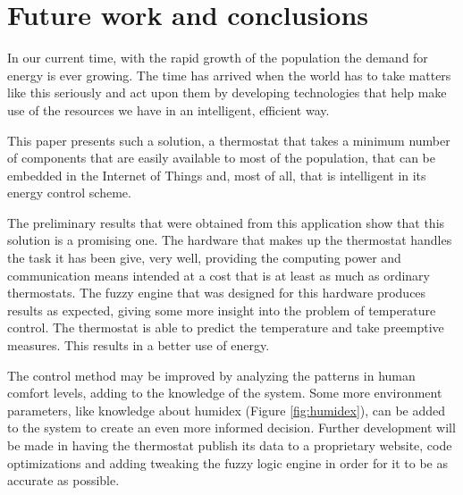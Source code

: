 
\chapter{Future work and conclusions}
\label{chap:concth}

\qquad In our current time, with the rapid growth of the population the demand for energy is ever growing.
The time has arrived when the world has to take matters like this seriously and act upon them by developing
technologies that help make use of the resources we have in an intelligent, efficient way.

\qquad This paper presents such a solution, a thermostat that takes a minimum number of components that are
easily available to most of the population, that can be embedded in the Internet of Things and, most of all,
that is intelligent in its energy control scheme.

\qquad The preliminary results that were obtained from this application show that this solution is a promising
one. The hardware that makes up the thermostat handles the task it has been give, very well, providing the
computing power and communication means intended at a cost that is at least as much as ordinary thermostats.
The fuzzy engine that was designed for this hardware produces results as expected, giving some more insight
into the problem of temperature control. The thermostat is able to predict the temperature and take preemptive
measures. This results in a better use of energy.

\qquad The control method may be improved by analyzing the patterns in  human comfort levels, adding to the
knowledge of the system. Some more environment parameters, like knowledge about humidex (Figure
\ref{fig:humidex}), can be added to the system to create an even more informed decision. Further development
will be made in having the thermostat publish its data to a proprietary website, code optimizations and
adding tweaking the fuzzy logic engine in order for it to be as accurate as possible.
